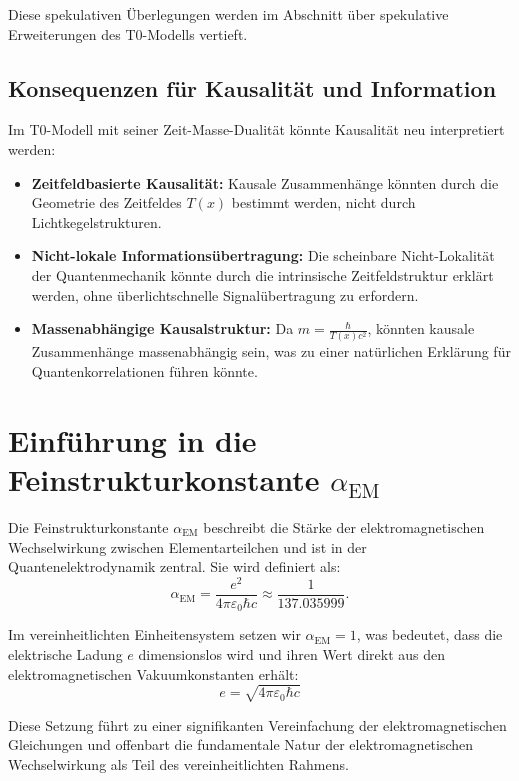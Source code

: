 \documentclass[12pt,a4paper]{article}
\newcommand{\Tfield}{T(x)}
\newcommand{\alphaEM}{\alpha_{\text{EM}}}
\begin{document}
	Diese spekulativen Überlegungen werden im Abschnitt über spekulative Erweiterungen des T0-Modells vertieft.
	
	\subsection{Konsequenzen für Kausalität und Information}
	
	Im T0-Modell mit seiner Zeit-Masse-Dualität könnte Kausalität neu interpretiert werden:
	\begin{itemize}
		\item \textbf{Zeitfeldbasierte Kausalität:} Kausale Zusammenhänge könnten durch die Geometrie des Zeitfeldes $\Tfield$ bestimmt werden, nicht durch Lichtkegelstrukturen.
		\item \textbf{Nicht-lokale Informationsübertragung:} Die scheinbare Nicht-Lokalität der Quantenmechanik könnte durch die intrinsische Zeitfeldstruktur erklärt werden, ohne überlichtschnelle Signalübertragung zu erfordern.
		\item \textbf{Massenabhängige Kausalstruktur:} Da $m = \frac{\hbar}{\Tfield c^2}$, könnten kausale Zusammenhänge massenabhängig sein, was zu einer natürlichen Erklärung für Quantenkorrelationen führen könnte.
	\end{itemize}
	
	\section{Einführung in die Feinstrukturkonstante \(\alphaEM\)}
	
	Die Feinstrukturkonstante \(\alphaEM\) beschreibt die Stärke der elektromagnetischen Wechselwirkung zwischen Elementarteilchen und ist in der Quantenelektrodynamik zentral. Sie wird definiert als:
	\begin{equation}
		\alphaEM = \frac{e^2}{4\pi \varepsilon_0 \hbar c} \approx \frac{1}{137.035999}.
	\end{equation}
	
	Im vereinheitlichten Einheitensystem setzen wir \(\alphaEM = 1\), was bedeutet, dass die elektrische Ladung \(e\) dimensionslos wird und ihren Wert direkt aus den elektromagnetischen Vakuumkonstanten erhält:
	\begin{equation}
		e = \sqrt{4\pi \varepsilon_0 \hbar c}
	\end{equation}
	
	Diese Setzung führt zu einer signifikanten Vereinfachung der elektromagnetischen Gleichungen und offenbart die fundamentale Natur der elektromagnetischen Wechselwirkung als Teil des vereinheitlichten Rahmens.
	
\end{document}
